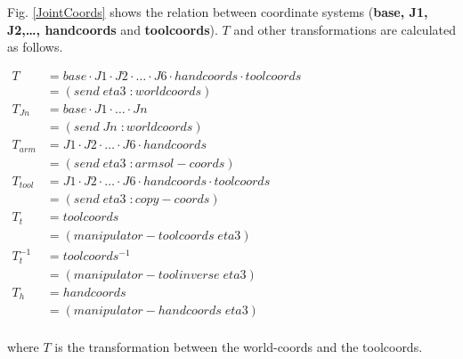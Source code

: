 Fig. \ref{JointCoords} shows the relation between coordinate systems 
({\bf base, J1, J2,\ldots , handcoords} and {\bf toolcoords}). $T$ and other 
transformations are calculated as follows.


$
\begin{array}{ll}
T & = base \cdot J1 \cdot J2 \cdot \ldots 
\cdot J6 \cdot handcoords \cdot toolcoords \\ 
 & = (send \; eta3 \; :worldcoords) \\ 
T_{Jn} & = base \cdot J1\cdot \ldots \cdot Jn \\
 & = (send \; Jn \; :worldcoords) \\
T_{arm} & = J1 \cdot J2 \cdot \ldots \cdot J6 \cdot handcoords \\ 
 & = (send \; eta3 \; :armsol-coords) \\ 
T_{tool} & = J1 \cdot J2 \cdot  \ldots \cdot J6 \cdot handcoords \cdot toolcoords \\ 
 & = (send \; eta3 \; :copy-coords) \\
T_{t} & = toolcoords \\ 
 & = (manipulator-toolcoords \; eta3)\\
T_{t}^{-1} & = toolcoords^{-1} \\ 
 & = (manipulator-toolinverse \; eta3) \\
T_{h} & = handcoords \\ 
 & = (manipulator-handcoords \; eta3)\\
\end{array}$

where $T$ is the transformation between the world-coords and the toolcoords.

